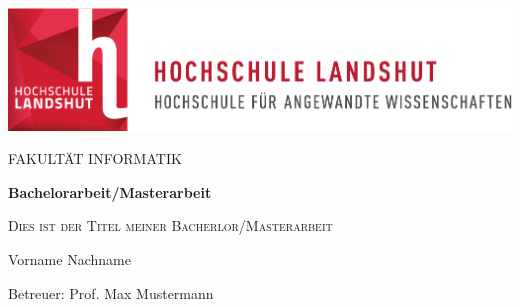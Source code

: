\thispagestyle{empty}
\begin{titlepage}
	\vspace{3cm}



\begin{center}
	\includegraphics[scale=0.8]{Titelseite/hl-logo.pdf}  
\end{center}

\vspace{2.5cm}

\begin{center}
  \Large FAKULTÄT INFORMATIK
\end{center}

\vspace{1cm}
\begin{center}
	\Huge
	\textbf{Bachelorarbeit/Masterarbeit}\\
\end{center}

\vspace{1cm}

\begin{center}
	\Large
	\textsc{Dies ist der Titel meiner Bacherlor/Masterarbeit}\\
\end{center}

\vspace{1.5cm}

\begin{center}
	\Large
	Vorname Nachname
\end{center}

\vspace{4cm}
\begin{center}
	\large
	Betreuer: Prof. Max Mustermann
\end{center}

\end{titlepage}
